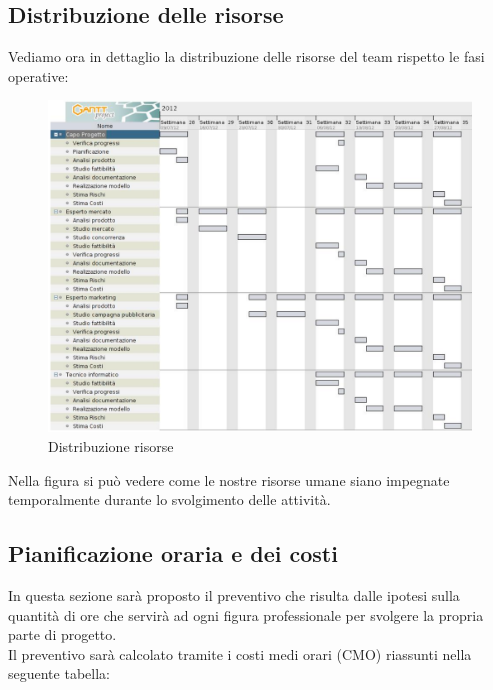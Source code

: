 \subsection{Distribuzione delle risorse}
Vediamo ora in dettaglio la distribuzione delle risorse del team rispetto le fasi operative:\\

\begin{figure}[H]
\centering
\includegraphics[scale=0.65]{images/cap3/risorse.png}
\caption{Distribuzione risorse}
\end{figure}

\vspace*{0.5cm}

Nella figura  si può vedere come le nostre risorse umane siano impegnate temporalmente durante lo svolgimento delle attività.

\newpage
\subsection{Pianificazione oraria e dei costi}

In questa sezione sarà proposto il preventivo che risulta dalle ipotesi sulla quantità di ore che servirà ad ogni figura professionale per svolgere la propria parte di progetto.\\
Il preventivo sarà calcolato tramite i costi medi orari (CMO) riassunti nella seguente tabella:\\

